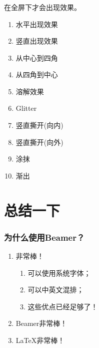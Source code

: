 \documentclass[presentation,11pt]{beamer}
\begin{document}
 \begin{frame}[<+->]
   \frametitle{\subsecname}
  在全屏下才会出现效果。
  \begin{enumerate}
  \item 水平出现效果
  \item 竖直出现效果
  \item 从中心到四角
  \item 从四角到中心
  \item 溶解效果
  \item Glitter
  \item 竖直撕开(向内)
  \item 竖直撕开(向外)
  \item 涂抹
  \item 渐出
  \end{enumerate}

 \end{frame}
  
 
\section{总结一下} 
 
 
\begin{frame} 
    \frametitle{为什么使用Beamer？} 
    \begin{enumerate} 
      \item \XeLaTeX 非常棒！ 
      \begin{enumerate} 
        \item 可以使用系统字体； 
        \item 可以中英文混排； 
        \item 这些优点已经足够了！ 
      \end{enumerate} 
      \item Beamer非常棒！ 
      \item \LaTeX 非常棒！ 
    \end{enumerate} 
\end{frame} 
 


 
 
\end{document}
